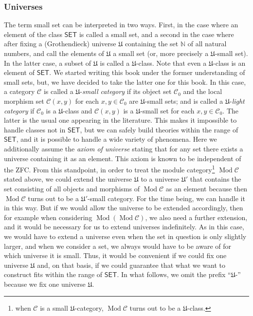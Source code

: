 \documentclass{surv-l}
\numberwithin{equation}{chapter}
\numberwithin{figure}{chapter}
\theoremstyle{plain}
\theoremstyle{definition}
\theoremstyle{remark}
\DeclareMathOperator{\Mod}{Mod}
\begin{document}
\subsubsection*{Universes}
The term small set can be interpreted in two ways.
First, in the case where an element of the class $\mathsf{SET}$ is called a small set,
and a second in the case where after fixing a (Grothendieck) universe $\mathfrak{U}$ containing the set $\mathbb{N}$
of all natural numbers,
and call the elements of $\mathfrak{U}$ a small set (or, more precisely a $\mathfrak{U}$-small set).
In the latter case, a subset of $\mathfrak{U}$ is called a $\mathfrak{U}$-class.
Note that even a $\mathfrak{U}$-class is an element of $\mathsf{SET}$.
We started writing this book under the former understanding of small sets,
but, we have decided to take the latter one for this book.
In this case, a category ${\mathcal{C}}$ is called a $\mathfrak{U}$-{\em small category} if
its object set ${\mathcal{C}}_0$ and the local morphism set ${\mathcal{C}}(x, y)$
for each $x, y \in {\mathcal{C}}_0$ are $\mathfrak{U}$-small sets;
and is called a $\mathfrak{U}$-{\em light category} if
${\mathcal{C}}_0$ is a $\mathfrak{U}$-class and ${\mathcal{C}}(x, y)$ is a $\mathfrak{U}$-small set for each
$x, y \in {\mathcal{C}}_0$.
The latter is the usual one appearing in the literature.
This makes it impossible to handle classes not in $\mathsf{SET}$,
but we can safely build theories within the range of $\mathsf{SET}$,
and it is possible to handle a wide variety of phenomena.
Here we additionally assume the {\em axiom of universe} stating that
for any set there exists a universe containing it as an element.
This axiom is known to be independent of the ZFC.
From this stand\-point, in order to treat the module category\footnote{when ${\mathcal{C}}$ is a small $\mathfrak{U}$-category, $\Mod {\mathcal{C}}$ turns out to be a $\mathfrak{U}$-class.}
$\Mod {\mathcal{C}}$ stated above,
we could extend the universe $\mathfrak{U}$
to a universe $\mathfrak{U}'$ that contains the set consisting of all objects and morphisms of
$\Mod {\mathcal{C}}$ as an element
because then $\Mod {\mathcal{C}}$ turns out to be a $\mathfrak{U}'$-small category.
For the time being, we can handle it in this way.
But if we would allow the universe to be extended accordingly, then
for example when considering $\Mod(\Mod {\mathcal{C}})$,
we also need a further extension, and it would be necessary for us to extend universes indefinitely.
As in this case,
we would have to extend a universe even when the set in question is only slightly larger,
and when we consider a set, we always would have to be aware of for which universe it is small.
Thus, it would be convenient if we could fix one universe $\mathfrak{U}$ and, on that basis,
if we could guarantee that what we want to construct fits within the range of $\mathsf{SET}$.
In what follows, we omit the prefix ``$\mathfrak{U}$-'' because we fix one universe $\mathfrak{U}$.
\end{document}
